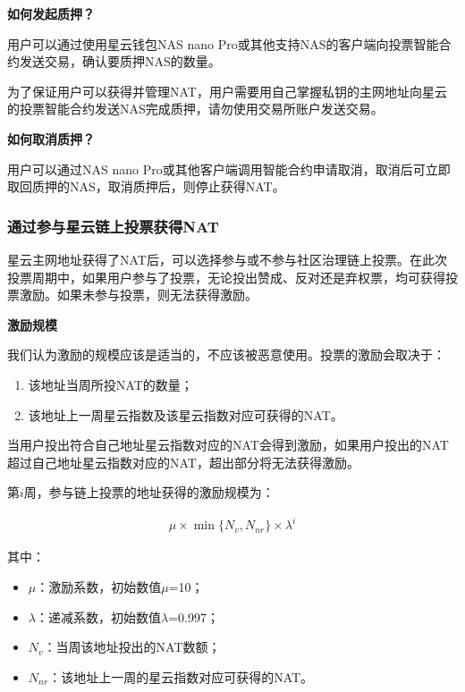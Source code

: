 \vspace{2em}

\textbf{如何发起质押？} 
	
用户可以通过使用星云钱包NAS nano Pro或其他支持NAS的客户端向投票智能合约发送交易，确认要质押NAS的数量。

为了保证用户可以获得并管理NAT，用户需要用自己掌握私钥的主网地址向星云的投票智能合约发送NAS完成质押，请勿使用交易所账户发送交易。

\vspace{2em}

\textbf{如何取消质押？}

用户可以通过NAS nano Pro或其他客户端调用智能合约申请取消，取消后可立即取回质押的NAS，取消质押后，则停止获得NAT。

\subsubsection{通过参与星云链上投票获得NAT}

星云主网地址获得了NAT后，可以选择参与或不参与社区治理链上投票。在此次投票周期中，如果用户参与了投票，无论投出赞成、反对还是弃权票，均可获得投票激励。如果未参与投票，则无法获得激励。

\vspace{2em}

\textbf{激励规模}

我们认为激励的规模应该是适当的，不应该被恶意使用。投票的激励会取决于：

\begin{enumerate}
	\item 该地址当周所投NAT的数量；
	\item 该地址上一周星云指数及该星云指数对应可获得的NAT。
\end{enumerate}

当用户投出符合自己地址星云指数对应的NAT会得到激励，如果用户投出的NAT超过自己地址星云指数对应的NAT，超出部分将无法获得激励。
	
第$i$周，参与链上投票的地址获得的激励规模为：

\begin{align}
\mu\times \min\{N_{v},N_{nr}\}  \times \lambda^{i}
\end{align}

其中：

\begin{itemize}
	\item $\mu$：激励系数，初始数值$\mu$=10；
	\item $\lambda$：递减系数，初始数值$\lambda$=0.997；
	\item $N_{v}$：当周该地址投出的NAT数额；
	\item $N_{nr}$：该地址上一周的星云指数对应可获得的NAT。
\end{itemize}

